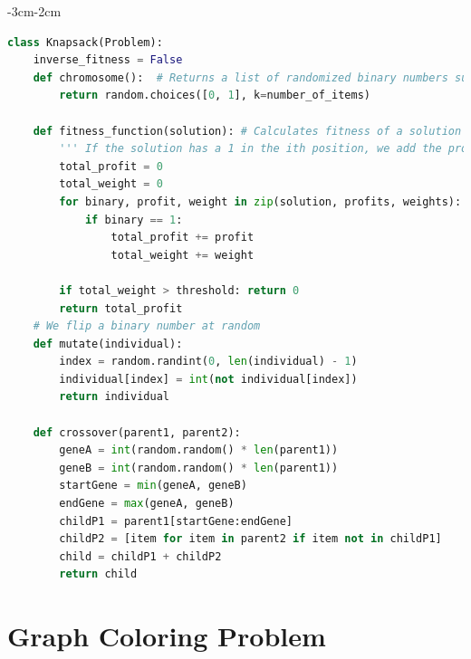 \documentclass[12pt]{report} %
\begin{document}
\newpage

\begin{changemargin}{-3cm}{-2cm}

	\begin{lstlisting}[language=python, caption= {Knapsack class}, captionpos=b]
class Knapsack(Problem):
    inverse_fitness = False
    def chromosome():  # Returns a list of randomized binary numbers such that 1 in the ith position means that the ith product is selected
        return random.choices([0, 1], k=number_of_items)

    def fitness_function(solution): # Calculates fitness of a solution
        ''' If the solution has a 1 in the ith position, we add the profit of the ith item to the total profit. Fitness is 0, if we exceeed the capacity of the knapsack'''
        total_profit = 0
        total_weight = 0
        for binary, profit, weight in zip(solution, profits, weights):
            if binary == 1:
                total_profit += profit
                total_weight += weight
        
        if total_weight > threshold: return 0
        return total_profit
    # We flip a binary number at random
    def mutate(individual):
        index = random.randint(0, len(individual) - 1)
        individual[index] = int(not individual[index])
        return individual

    def crossover(parent1, parent2):
        geneA = int(random.random() * len(parent1))
        geneB = int(random.random() * len(parent1))
        startGene = min(geneA, geneB)
        endGene = max(geneA, geneB)
        childP1 = parent1[startGene:endGene]
        childP2 = [item for item in parent2 if item not in childP1]
        child = childP1 + childP2
        return child

\end{lstlisting}
\end{changemargin}




\section{Graph Coloring Problem}
\end{document}
